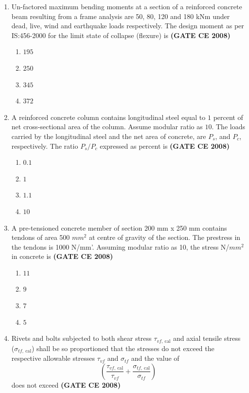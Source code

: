 \documentclass[journal]{IEEEtran}
\begin{document}
\begin{enumerate}
\item Un-factored maximum bending moments at a section of a reinforced concrete beam resulting from
a frame analysis are 50, 80, 120 and 180 kNm under dead, live, wind and earthquake loads
respectively. The design moment  as per IS:456-2000 for the limit state of collapse (flexure)
is \textbf{(GATE CE 2008)}

\begin{enumerate}
\item $195$
\item $250$
\item $345$
\item $372$
\end{enumerate}

\item A reinforced concrete column contains longitudinal steel equal to $1$ percent of net cross-sectional area of the column. Assume modular ratio as $10$. The loads carried  by the longitudinal steel and the net area of concrete, are $P_s$, and $P_c$, respectively. The ratio $P_s/P_c$ expressed
as percent is \textbf{(GATE CE 2008)}

\begin{enumerate}
\item $0.1$
\item $1$
\item $1.1$
\item $10$
\end{enumerate}

\item A pre-tensioned concrete member of section 200 mm x 250 mm contains tendons of area 500 $mm^{2}$
at centre of gravity of the section. The prestress in the tendons is 1000 N/mm'. Assuming modular
ratio as 10, the stress N/$mm^{2}$ in concrete is \textbf{(GATE CE 2008)}

\begin{enumerate}
\item $11$
\item $9$
\item $7$
\item $5$
\end{enumerate}

\item Rivets and bolts subjected to both shear stress $\tau_{vf,\ \text{cal}}$ and axial tensile stress ($\sigma_{tf,\ \text{cal}}$) shall be so proportioned that the stresses do not exceed the respective allowable stresses $\tau_{vf}$ and $\sigma_{tf}$ and the value of
\[
\left( \frac{\tau_{vf,\ \text{cal}}}{\tau_{vf}} + \frac{\sigma_{tf,\ \text{cal}}}{\sigma_{tf}} \right)
\]
does not exceed \textbf{(GATE CE 2008)}


\end{enumerate}
\end{document}
